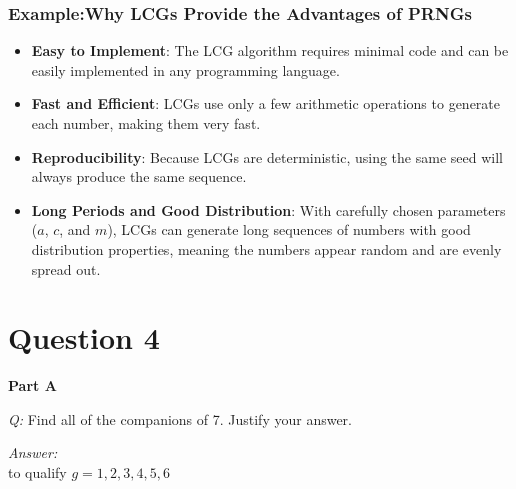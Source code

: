 \documentclass{article}
\begin{document}
	\subsubsection*{Example:Why LCGs Provide the Advantages of PRNGs}
	\begin{itemize}
		\item \textbf{Easy to Implement}: The LCG algorithm requires minimal code and can be easily implemented in any programming language.
		\item \textbf{Fast and Efficient}: LCGs use only a few arithmetic operations to generate each number, making them very fast.
		\item \textbf{Reproducibility}: Because LCGs are deterministic, using the same seed will always produce the same sequence. 
		\item \textbf{Long Periods and Good Distribution}: With carefully chosen parameters (\(a\), \(c\), and \(m\)), LCGs can generate long sequences of numbers with good distribution properties, meaning the numbers appear random and are evenly spread out.
	\end{itemize}

	\newpage
	
	\section{Question 4}
	
	\textbf{Part A}
	
	\textit{Q:} Find all of the companions of 7. Justify your answer.
	
	\textit{Answer:} \\
	to qualify \( g = 1, 2, 3, 4, 5, 6 \) 
	
\end{document}
